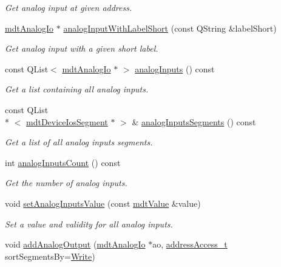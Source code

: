 \begin{DoxyCompactItemize}
\begin{DoxyCompactList}\small\item\em Get analog input at given address. \end{DoxyCompactList}\item 
\hyperlink{classmdt_analog_io}{mdt\-Analog\-Io} $\ast$ \hyperlink{classmdt_device_ios_ae31753e23d7ab14073f852dca85c2f9e}{analog\-Input\-With\-Label\-Short} (const Q\-String \&label\-Short)
\begin{DoxyCompactList}\small\item\em Get analog input with a given short label. \end{DoxyCompactList}\item 
const Q\-List$<$ \hyperlink{classmdt_analog_io}{mdt\-Analog\-Io} $\ast$ $>$ \hyperlink{classmdt_device_ios_aab70f76d2107f0a9324a9b9d4db21532}{analog\-Inputs} () const 
\begin{DoxyCompactList}\small\item\em Get a list containing all analog inputs. \end{DoxyCompactList}\item 
const Q\-List\\*
$<$ \hyperlink{classmdt_device_ios_segment}{mdt\-Device\-Ios\-Segment} $\ast$ $>$ \& \hyperlink{classmdt_device_ios_a71a1b9cdbc524e4d0094ab37575defc1}{analog\-Inputs\-Segments} () const 
\begin{DoxyCompactList}\small\item\em Get a list of all analog inputs segments. \end{DoxyCompactList}\item 
int \hyperlink{classmdt_device_ios_a904069e2e641c92291226ea2524eadb3}{analog\-Inputs\-Count} () const 
\begin{DoxyCompactList}\small\item\em Get the number of analog inputs. \end{DoxyCompactList}\item 
void \hyperlink{classmdt_device_ios_aeaa1a401ec975a67f87c62d4abae65ee}{set\-Analog\-Inputs\-Value} (const \hyperlink{classmdt_value}{mdt\-Value} \&value)
\begin{DoxyCompactList}\small\item\em Set a value and validity for all analog inputs. \end{DoxyCompactList}\item 
void \hyperlink{classmdt_device_ios_aa0e736fa9663fa133cbf337d5a4b90e2}{add\-Analog\-Output} (\hyperlink{classmdt_analog_io}{mdt\-Analog\-Io} $\ast$ao, \hyperlink{classmdt_device_ios_a72fc3fdcd905d669b1e90496e808d6dd}{address\-Access\-\_\-t} sort\-Segments\-By=\hyperlink{classmdt_device_ios_a72fc3fdcd905d669b1e90496e808d6dda29a5b11f060f7fce671b9ced4bb4ef7a}{Write})

\end{DoxyCompactItemize}
